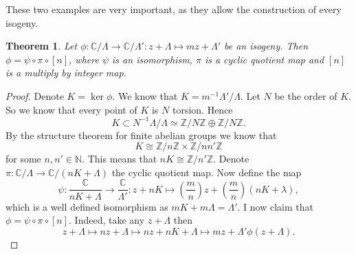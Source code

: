 \documentclass[a4paper]{article}
\theoremstyle{theoremdd}
\newtheorem{theorem}{Theorem}[section]
\theoremstyle{definitiondd}
\theoremstyle{remarkdd}
\newcommand{\N}{\mathbb{N}}
\newcommand{\Z}{\mathbb{Z}}
\newcommand{\C}{\mathbb{C}}
\begin{document}
These two examples are very important, as they allow the construction of every isogeny. 
\begin{theorem}
	Let $\phi: \C / \Lambda \to \C / \Lambda': z + \Lambda \mapsto mz + \Lambda'$ be an isogeny. Then $\phi = \psi \circ \pi \circ [n]$, where  $\psi$ is an isomorphism, $\pi$ is a cyclic quotient map and $[n]$ is a multiply by integer map.
\end{theorem}
\begin{proof}
	Denote $K = \ker \phi$. We know that $K = m^{-1} \Lambda' / \Lambda$.
	Let $N$ be the order of $K$. So we know that every point of $K$ is $N$ torsion. 
	Hence \[
		K \subset N^{-1} \Lambda / \Lambda \simeq \Z / N \Z \oplus \Z / N \Z. 
	\]
	By the structure theorem for finite abelian groups we know that  \[
	K \cong \Z / n \Z \times \Z / n n' \Z
	\]
	for some $n, n'\in \N$. 
	This means that $nK \cong \Z / n' \Z$. Denote $\pi: \C / \Lambda \to \C / (nK + \Lambda)$ the cyclic quotient map. Now define the map \[
		\psi: \frac{\C}{nK + \Lambda} \to \frac{\C}{\Lambda'}: z + nK \mapsto  \left(\frac{m}{n}\right) z + \left( \frac{m}{n} \right)(nK + \lambda)
	,\] 
	which is a well defined isomorphism as $mK + m\Lambda = \Lambda'$. 
	I now claim that $\phi = \psi \circ \pi \circ [n]$. Indeed, take any $z + \Lambda$ then \[
		z + \Lambda \mapsto nz + \Lambda \mapsto  nz + nK + \Lambda \mapsto  mz + \Lambda' \phi(z + \Lambda)
	.\]  
\end{proof}

\end{document}
